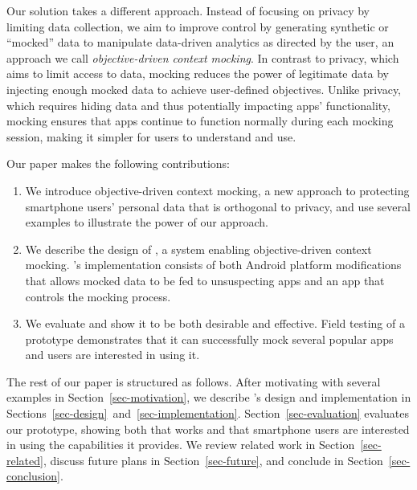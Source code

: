 
Our solution takes a different approach. Instead of focusing on privacy by
limiting data collection, we aim to improve control by generating synthetic or
``mocked'' data to manipulate data-driven analytics as directed by the user, an
approach we call \textit{objective-driven context mocking}. In contrast to
privacy, which aims to limit access to data, mocking reduces the power of
legitimate data by injecting enough mocked data to achieve user-defined
objectives.  Unlike privacy, which requires hiding data and thus potentially
impacting apps' functionality, mocking ensures that apps continue to function
normally during each mocking session, making it simpler for users to understand
and use.

Our paper makes the following contributions:

\begin{enumerate}

\item We introduce objective-driven context mocking, a new approach to
protecting smartphone users' personal data that is orthogonal to privacy, and
use several examples to illustrate the power of our approach.

\item We describe the design of \PocketMocker{}, a system enabling
objective-driven context mocking. \PocketMocker{}'s implementation consists
of both Android platform modifications that allows mocked data to be fed to
unsuspecting apps and an app that controls the mocking process.

\item We evaluate \PocketMocker{} and show it to be both desirable and
effective. Field testing of a \PocketMocker{} prototype demonstrates that it
can successfully mock several popular apps and users are interested in using
it.

\end{enumerate}

The rest of our paper is structured as follows. After motivating
\PocketMocker{} with several examples in Section~\ref{sec-motivation}, we
describe \PocketMocker{}'s design and implementation in
Sections~\ref{sec-design}~and~\ref{sec-implementation}.
Section~\ref{sec-evaluation} evaluates our \PocketMocker{} prototype, showing
both that \PocketMocker{} works and that smartphone users are interested in
using the capabilities it provides. We review related work in
Section~\ref{sec-related}, discuss future plans in Section~\ref{sec-future},
and conclude in Section~\ref{sec-conclusion}.
